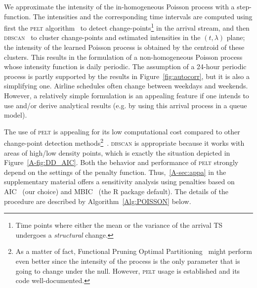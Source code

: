 \documentclass[draft,review]{elsarticle}
\newcommand{\PELT}{\textsc{pelt}}
\newcommand{\DBSCAN}{\textsc{dbscan}}
\begin{document}
We approximate the intensity of the in-homogeneous Poisson process with a step-function.
The intensities and the corresponding time intervals are computed using first the \PELT{} algorithm~\citep{killick2012optimal} to detect change-points\footnote{Time points where either the mean or the variance of the arrival \ac{TS} undergoes a \emph{structural} change.} in the arrival stream, and then \DBSCAN{}~\citep{ester1996density,pedregosa2011scikit} to cluster change-points and estimated intensities in the \((t, \lambda)\) plane; the intensity of the learned Poisson process is obtained by the centroid of these clusters.
This results in the formulation of a non-homogeneous Poisson process whose intensity function is daily periodic. The assumption of a 24-hour periodic process is partly supported by the results in Figure~\ref{fig:autocorr}, but it is also a simplifying one. Airline schedules often change between weekdays and weekends. However, a relatively simple formulation is an appealing feature if one intends to use and/or derive analytical results (e.g. by using this arrival process in a queue model).

The use of \PELT{} is appealing for its low computational cost compared to other change-point detection methods\footnote{As a matter of fact, Functional Pruning Optimal Partitioning~\citep{maidstone2017} might perform even better since the intensity of the process is the only parameter that is going to change under the null.
However, \PELT{} usage is established and its code well-documented.}~\citep{killick2012optimal}.
\DBSCAN{} is appropriate because it works with areas of high/low density points, which is exactly the situation depicted in Figure~\ref{A-fig:DD_AIC}.
Both the behavior and performance of \PELT{} strongly depend on the settings of the penalty function.
Thus,~\ref{A-sec:appa} in the supplementary material offers a sensitivity analysis using penalties based on  \ac{AIC}~\citep{akaike1973information} (our choice) and \ac{MBIC}~\citep{zhang2007modified} (the R package default).
The details of the procedure are described by Algorithm~\ref{Alg:POISSON} below.

\end{document}

